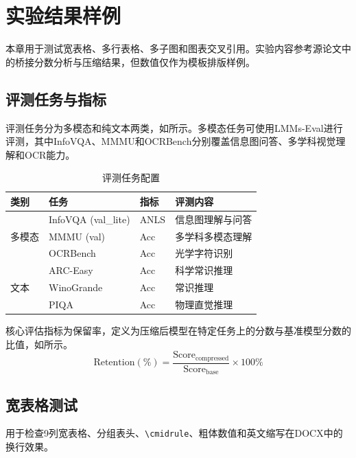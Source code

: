 \section{实验结果样例}
本章用于测试宽表格、多行表格、多子图和图表交叉引用。实验内容参考源论文中的桥接分数分析与压缩结果，但数值仅作为模板排版样例。

\subsection{评测任务与指标}
评测任务分为多模态和纯文本两类，如所示。多模态任务可使用LMMs-Eval进行评测\cite{zhang2024lmmseval}，其中InfoVQA、MMMU和OCRBench分别覆盖信息图问答、多学科视觉理解和OCR能力\cite{mathew2022infographicvqa,yue2024mmmu,liu2024ocrbench}。

\begin{table}[!ht]
    \centering
    \caption{评测任务配置}
    \label{chart:tasks}
    \begin{tabular}{llll}
    \toprule
        类别 & 任务 & 指标 & 评测内容 \\ \midrule
        \multirow{3}{*}{多模态} & InfoVQA (val\_lite) & ANLS & 信息图理解与问答 \\
        & MMMU (val) & Acc & 多学科多模态理解 \\
        & OCRBench & Acc & 光学字符识别 \\ \midrule
        \multirow{3}{*}{文本} & ARC-Easy & Acc & 科学常识推理 \\
        & WinoGrande & Acc & 常识推理 \\
        & PIQA & Acc & 物理直觉推理 \\
    \bottomrule
    \end{tabular}
\end{table}

核心评估指标为保留率，定义为压缩后模型在特定任务上的分数与基准模型分数的比值，如所示。
\begin{equation}
    \label{eq:retention}
    \text{Retention}(\%) = \frac{\text{Score}_{\text{compressed}}}{\text{Score}_{\text{base}}} \times 100\%
\end{equation}

\subsection{宽表格测试}
用于检查9列宽表格、分组表头、\verb|\cmidrule|、粗体数值和英文缩写在DOCX中的换行效果。

